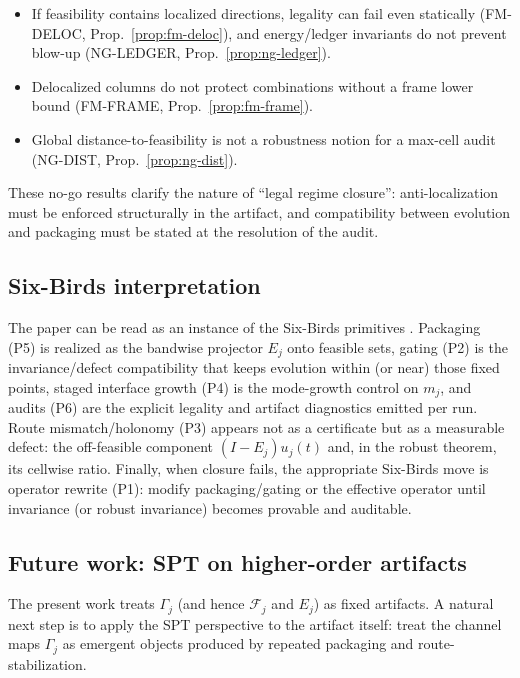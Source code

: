 \documentclass[11pt]{article}
\begin{document}
\begin{itemize}
\item If feasibility contains localized directions, legality can fail even statically (FM-DELOC, Prop.\ \ref{prop:fm-deloc}), and energy/\allowbreak ledger invariants do not prevent blow-up (NG-LEDGER, Prop.~\ref{prop:ng-ledger}).
\item Delocalized columns do not protect combinations without a frame lower bound (FM-FRAME, Prop.~\ref{prop:fm-frame}).
\item Global distance-to-feasibility is not a robustness notion for a max-cell audit (NG-DIST, Prop.~\ref{prop:ng-dist}).
\end{itemize}

These no-go results clarify the nature of ``legal regime closure'': anti-localization must be enforced structurally in the artifact, and compatibility between evolution and packaging must be stated at the resolution of the audit.

\subsection{Six-Birds interpretation}

The paper can be read as an instance of the Six-Birds primitives \cite{Tsiokos2026SixBirds}.
Packaging (P5) is realized as the bandwise projector $E_j$ onto feasible sets, gating (P2) is the invariance/defect compatibility that keeps evolution within (or near) those fixed points, staged interface growth (P4) is the mode-growth control on $m_j$, and audits (P6) are the explicit legality and artifact diagnostics emitted per run.
Route mismatch/holonomy (P3) appears not as a certificate but as a measurable defect: the off-feasible component $(I-E_j)u_j(t)$ and, in the robust theorem, its cellwise ratio.
Finally, when closure fails, the appropriate Six-Birds move is operator rewrite (P1): modify packaging/gating or the effective operator until invariance (or robust invariance) becomes provable and auditable.

\subsection{Future work: SPT on higher-order artifacts}

The present work treats $\Gamma_j$ (and hence $\mathcal{F}_j$ and $E_j$) as fixed artifacts.
A natural next step is to apply the SPT perspective to the artifact itself: treat the channel maps $\Gamma_j$ as emergent objects produced by repeated packaging and route-stabilization.
\end{document}
